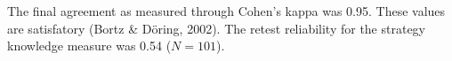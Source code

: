\documentclass[D:/studies/WinnerS/Erhebungen/IPhO1718/paper/probsol_paper/main/TaylorFrancis/interactapasample]{subfiles}
\begin{document}
The final agreement as measured through Cohen's kappa was 0.95. These values are satisfatory (Bortz \& D\"o{}ring, 2002). The retest reliability for the strategy knowledge measure was 0.54 ($N=101$).


\end{document}
